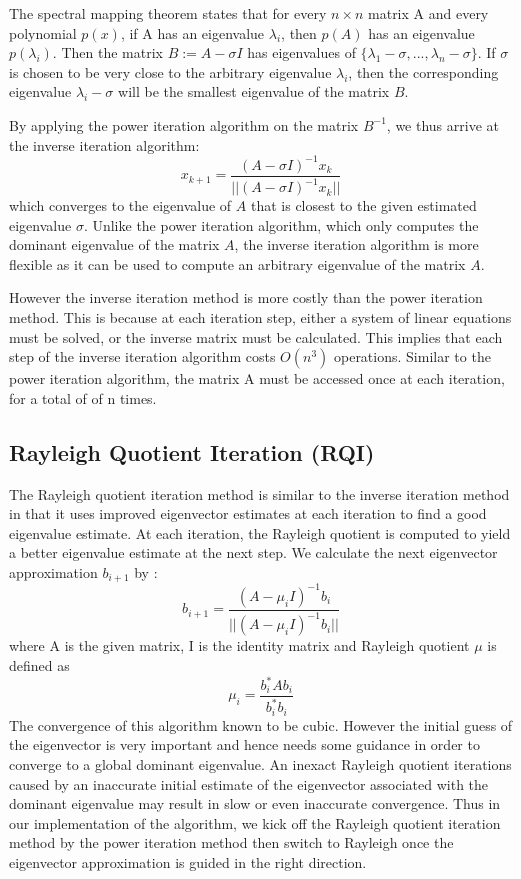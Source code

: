 \documentclass[11pt]{amsart}
\begin{document}
The spectral mapping theorem states that for every $n\times n$ matrix A and every polynomial $p(x)$, if A has an eigenvalue $\lambda_i$, then $p(A)$ has an eigenvalue $p(\lambda_i)$. Then the matrix $B := A - \sigma I$ has eigenvalues of $\{\lambda_1 - \sigma,...,\lambda_n - \sigma\}$. If $\sigma$ is chosen to be very close to the arbitrary eigenvalue $\lambda_i$, then the corresponding eigenvalue $\lambda_i - \sigma$ will be the smallest eigenvalue of the matrix $B$.

By applying the power iteration algorithm on the matrix $B^{-1}$, we thus arrive at the inverse iteration algorithm: 
\[
	x_{k+1} = \frac{(A-\sigma I)^{-1}x_k}{||(A-\sigma I)^{-1}x_k||}
\]
which converges to the eigenvalue of $A$ that is closest to the given estimated eigenvalue $\sigma$. Unlike the power iteration algorithm, which only computes the dominant eigenvalue of the matrix $A$, the inverse iteration algorithm is more flexible as it can be used to compute an arbitrary eigenvalue of the matrix $A$.

However the inverse iteration method is more costly than the power iteration method. This is because at each iteration step, either a system of linear equations must be solved, or the inverse matrix must be calculated. This implies that each step of the inverse iteration algorithm costs $O(n^3)$ operations. Similar to the power iteration algorithm, the matrix A must be accessed once at each iteration, for a total of of n times. 



\subsection{Rayleigh Quotient Iteration (RQI)}
The Rayleigh quotient iteration method is similar to the inverse iteration method in that it uses improved eigenvector estimates at each iteration to find a good eigenvalue estimate. At each iteration, the Rayleigh quotient is computed to  yield a better eigenvalue estimate at the next step. We calculate the next eigenvector approximation $b_{i+1}$ by :
\[
b_{i+1} = \frac{(A-\mu_{i}I)^{-1}b_i}{||(A-\mu_{i}I)^{-1}b_{i}||}
\]
where A is the given matrix, I is the identity matrix and Rayleigh quotient $\mu$ is defined as
\[
\mu_i = \frac{b^\ast_iAb_i}{b^\ast_ib_i}
\]
The convergence of this algorithm known to be cubic. However the initial guess of the eigenvector is very important and hence needs some guidance in order to converge to a global dominant eigenvalue. An inexact Rayleigh quotient iterations caused by an inaccurate initial estimate of the eigenvector associated with the dominant eigenvalue may result in slow or even inaccurate convergence. Thus in our implementation of the algorithm, we kick off the Rayleigh quotient iteration method by the power iteration method then switch to Rayleigh once the eigenvector approximation is guided in the right direction. 
\end{document}
